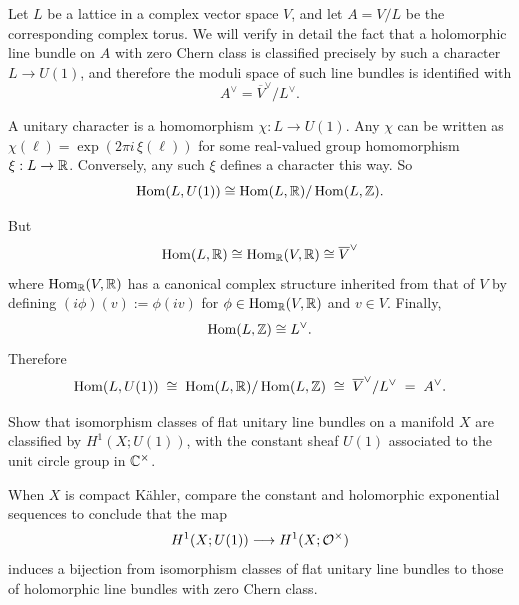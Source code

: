 \documentclass[12pt]{article}
\begin{document}
\begin{remark}
    Let $L$ be a lattice in a complex vector space $V$, and let
$A=V/L$ be the corresponding complex torus. We will verify in detail the fact that a holomorphic line bundle on $A$ with zero Chern class is classified precisely by such a character $L\to U(1)$, and therefore the moduli space of such line bundles is identified with
\[A^\vee = \overline{V}^\vee / L^\vee.
\]

  A unitary character is a homomorphism $\chi: L \longrightarrow U(1)$. Any $\chi$ can be written as $\chi(\ell)=\exp(2\pi i\,\xi(\ell))$ for some real-valued group homomorphism $\xi: L\to\mathbb{R}$. Conversely, any such $\xi$ defines a character this way. So
  \[
  \operatorname{Hom}(L,U(1)) \cong \operatorname{Hom}(L,\mathbb{R})/\operatorname{Hom}(L,\mathbb{Z}).
  \]

  But
  \[
  \operatorname{Hom}(L,\mathbb{R}) \cong \operatorname{Hom}_{\mathbb{R}}(V,\mathbb{R}) \cong \overline{V}^\vee
  \]
  where $\operatorname{Hom}_{\mathbb{R}}(V,\mathbb{R})$ has a canonical complex structure inherited from that of $V$ by defining $(i\phi)(v) := \phi(iv)$ for $\phi\in \operatorname{Hom}_{\mathbb{R}}(V,\mathbb{R})$ and $v\in V$.
  Finally,
  \[
  \operatorname{Hom}(L,\mathbb{Z})\cong L^\vee.
  \]
  Therefore
  \[
  \operatorname{Hom}(L,U(1))
  \;\cong\;
  \operatorname{Hom}(L,\mathbb{R})/\operatorname{Hom}(L,\mathbb{Z})
  \;\cong\;
  \overline{V}^\vee / L^\vee
  \;=\;
  A^\vee.
  \]
\end{remark}

\begin{exercise}
Show that isomorphism classes of flat unitary line bundles on a
manifold $X$ are classified by $H^1(X;U(1))$, with the constant sheaf $U(1)$
associated to the unit circle group in $\mathbb{C}^\times$.

When $X$ is compact K\"ahler, compare the constant and holomorphic
exponential sequences to conclude that the map
\[
H^1(X;U(1))\longrightarrow H^1(X;{\mathcal{O}}^\times)
\]
induces a bijection from isomorphism classes of flat unitary line bundles to
those of holomorphic line bundles with zero Chern class.
\end{exercise}
\end{document}
